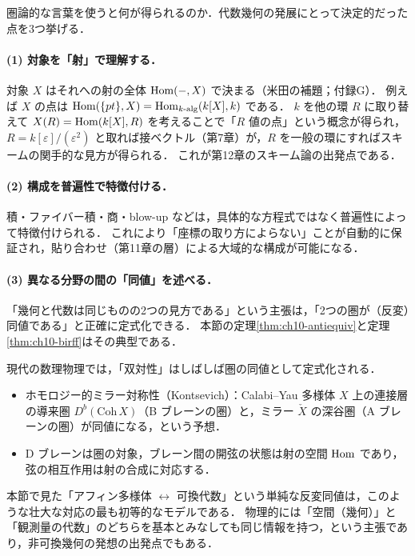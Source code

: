 圏論的な言葉を使うと何が得られるのか．代数幾何の発展にとって決定的だった点を3つ挙げる．

\paragraph{(1) 対象を「射」で理解する．}
対象 $X$ はそれへの射の全体 $\operatorname{Hom}(-,X)$ で決まる（米田の補題；付録G）．
例えば $X$ の点は $\operatorname{Hom}(\{pt\},X)=\operatorname{Hom}_{k\text{-alg}}(k[X],k)$ である．
$k$ を他の環 $R$ に取り替えて $X(R)=\operatorname{Hom}(k[X],R)$ を考えることで「$R$ 値の点」という概念が得られ，$R=k[\varepsilon]/(\varepsilon^2)$ と取れば接ベクトル（第7章）が，$R$ を一般の環にすればスキームの関手的な見方が得られる．
これが第12章のスキーム論の出発点である．

\paragraph{(2) 構成を普遍性で特徴付ける．}
積・ファイバー積・商・blow-up などは，具体的な方程式ではなく普遍性によって特徴付けられる．
これにより「座標の取り方によらない」ことが自動的に保証され，貼り合わせ（第11章の層）による大域的な構成が可能になる．

\paragraph{(3) 異なる分野の間の「同値」を述べる．}
「幾何と代数は同じものの2つの見方である」という主張は，「2つの圏が（反変）同値である」と正確に定式化できる．
本節の定理\ref{thm:ch10-antiequiv}と定理\ref{thm:ch10-birff}はその典型である．

\begin{physbox}[双対性と圏の同値]
現代の数理物理では，「双対性」はしばしば圏の同値として定式化される．
\begin{itemize}
  \item ホモロジー的ミラー対称性（Kontsevich）：Calabi--Yau 多様体 $X$ 上の連接層の導来圏 $D^b(\mathrm{Coh}\,X)$（B ブレーンの圏）と，ミラー $\check X$ の深谷圏（A ブレーンの圏）が同値になる，という予想．
  \item D ブレーンは圏の対象，ブレーン間の開弦の状態は射の空間 $\operatorname{Hom}$ であり，弦の相互作用は射の合成に対応する．
\end{itemize}
本節で見た「アフィン多様体 $\leftrightarrow$ 可換代数」という単純な反変同値は，このような壮大な対応の最も初等的なモデルである．
物理的には「空間（幾何）」と「観測量の代数」のどちらを基本とみなしても同じ情報を持つ，という主張であり，非可換幾何の発想の出発点でもある．
\end{physbox}

